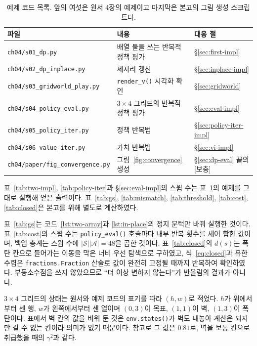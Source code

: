 \documentclass[11pt,a4paper]{article}
\newcommand{\Sset}{\mathcal{S}}
\newcommand{\Aset}{\mathcal{A}}
\begin{document}
\begin{table}[htbp]
\centering
\caption{예제 코드 목록. 앞의 여섯은 원서 4장의 예제이고 마지막은 본고의 그림 생성 스크립트다.}
\label{tab:code}
\small
\begin{tabular}{@{}lll@{}}
\toprule
파일 & 내용 & 대응 절 \\
\midrule
\texttt{ch04/s01\_dp.py}             & 배열 둘을 쓰는 반복적 정책 평가        & \S\ref{sec:first-impl} \\
\texttt{ch04/s02\_dp\_inplace.py}    & 제자리 갱신                            & \S\ref{sec:inplace-impl} \\
\texttt{ch04/s03\_gridworld\_play.py}& \texttt{render\_v()} 시각화 확인       & \S\ref{sec:gridworld} \\
\texttt{ch04/s04\_policy\_eval.py}   & $3\times4$ 그리드의 반복적 정책 평가   & \S\ref{sec:eval-impl} \\
\texttt{ch04/s05\_policy\_iter.py}   & 정책 반복법                            & \S\ref{sec:policy-iter-impl} \\
\texttt{ch04/s06\_value\_iter.py}    & 가치 반복법                            & \S\ref{sec:vi-impl} \\
\texttt{ch04/paper/fig\_convergence.py} & 그림~\ref{fig:convergence} 생성     & \S\ref{sec:dp-eval} 끝의 [보충] \\
\bottomrule
\end{tabular}
\end{table}

표~\ref{tab:two-impl}, \ref{tab:policy-iter}과 \S\ref{sec:eval-impl}의 스윕 수는 표~\ref{tab:code}의 예제를 그대로
실행해 얻은 출력이다. 표~\ref{tab:gs}, \ref{tab:mismatch}, \ref{tab:threshold}, \ref{tab:cost},
\ref{tab:closed}은 본고를 위해 별도로 계산하였다.

표~\ref{tab:gs}는 코드~\ref{lst:two-array}과 \ref{lst:in-place}의 정지 문턱만 바꿔 실행한 것이다.
표~\ref{tab:cost}의 스윕 수는 \lstinline|policy_eval()| 호출마다 내부 반복 횟수를 세어 합한 값이며,
백업 총계는 스윕 수에 $|\Sset||\Aset|=48$을 곱한 것이다.
표~\ref{tab:closed}의 $d(s)$는 폭탄 칸으로 들어가는 이동을 막은 너비 우선 탐색으로 구하였고,
식~\eqref{eq:closed}과 유한 수렴은 \lstinline|fractions.Fraction| 산술로 값이 완전히 고정될 때까지
반복하여 확인하였다. 부동소수점을 쓰지 않았으므로 ``더 이상 변하지 않는다''가 반올림의 결과가 아니다.

$3\times4$ 그리드의 상태는 원서와 예제 코드의 표기를 따라 $(h,w)$로 적었다. $h$가 위에서부터 센 행,
$w$가 왼쪽에서부터 센 열이며 $(0,3)$이 목표, $(1,1)$이 벽, $(1,3)$이 폭탄이다. 표에서 벽 칸의 값을
비워 둔 것은 \lstinline|env.states()|가 벽도 내놓아 계산은 되지만 갈 수 없는 칸이라 의미가 없기
때문이다. 참고로 그 값은 $0.81$로, 벽을 보통 칸으로 취급했을 때의 $\gamma^2$과 같다.
\end{document}
